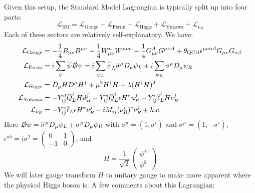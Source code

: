 \documentclass[11pt, oneside]{article}   	%
\theoremstyle{definition}
\begin{document}
Given this setup, the Standard Model Lagrangian is typically split up into four parts:
\begin{equation}
	\mathcal L_\mathrm{SM} = \mathcal{L}_\mathrm{Gauge} + \mathcal{L}_\mathrm{Fermi} + \mathcal{L}_\mathrm{Higgs} + 
	\mathcal{L}_\mathrm{Yukawa} + \mathcal{L}_{\nu_R}
\end{equation}
Each of these sectors are relatively self-explanatory. We have:
\begin{align}
	\mathcal{L}_\mathrm{Gauge} &= -\frac{1}{4} B_{\mu\nu} B^{\mu\nu} - \frac{1}{4} W_{\mu\nu}^a W^{\mu\nu a} - \frac{1}{4} 
	G_{\mu\nu}^A G^{\mu\nu A} + \theta_\mathrm{QCD} \epsilon^{\mu\nu\alpha\beta} G_{\mu\nu} G_{\alpha\beta} \\
	\mathcal{L}_\mathrm{Fermi} &= i\sum_\psi\overline\psi \slashed D \psi = i\sum_{\psi_L} \overline\psi_L 
	\overline\sigma^\mu D_\mu\psi_L + i\sum_{\psi_R} \sigma^\mu D_\mu \psi_R \\
	\mathcal{L}_\mathrm{Higgs} &= D_\mu H D^\mu H^\dagger + \mu^2 H^\dagger H - \lambda (H^\dagger H)^2 \\
	\mathcal{L}_\mathrm{Yukawa} &= - Y_{ij}^d \overline Q_L^i H d_R^j - Y_{ij}^u \overline Q_L^i\epsilon H^* u_R^j - 
	Y_{ij}^e \overline\ell_L^i H e_R^j~\label{eq:yukawa} \\
	\mathcal{L}_{\nu_R} &= -Y_{ij}^\nu \overline \ell_L\epsilon H^* \nu_R^j - i M_{ij} (\nu_R^i)^c \nu_R^j + h.c.
\end{align}
Here $\slashed D\psi = \overline\sigma^\mu D_\mu \psi_L + \sigma^\mu D_\mu \psi_R$ with $\sigma^\mu = (1, 
\sigma^i)$ and $\overline\sigma^\mu = (1, -\sigma^i)$, $\epsilon^{ab} = i\sigma^2 = \begin{pmatrix} 0 & 1 \\ -1 & 0 \end{pmatrix}$, 
and 
\begin{equation}
	H = \frac{1}{\sqrt{2}}\begin{pmatrix} \phi^+ \\ \phi^0 \end{pmatrix}
\end{equation}
We will later gauge transform $H$ to unitary gauge to make more apparent where the physical Higgs boson is. A few 
comments about this Lagrangian:
\end{document}
